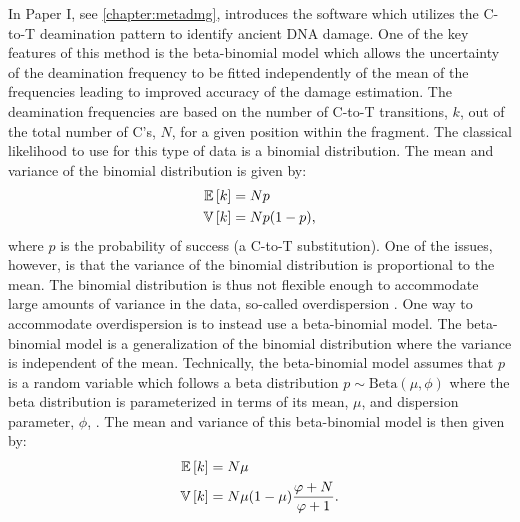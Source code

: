 In Paper I, see \autoref{chapter:metadmg}, introduces the \metaDMG software which utilizes the C-to-T deamination pattern to identify ancient DNA damage. One of the key features of this method is the beta-binomial model which allows the uncertainty of the deamination frequency to be fitted independently of the mean of the frequencies leading to improved accuracy of the damage estimation. The deamination frequencies are based on the number of C-to-T transitions, $k$, out of the total number of C's, $N$, for a given position within the fragment. The classical likelihood to use for this type of data is a binomial distribution. The mean and variance of the binomial distribution is given by:
\begin{equation}
    \begin{split}
        \mathbb{E}\left[{k}\right]  &= N p \\
        \mathbb{V}\left[{k}\right] &= Np(1-p),
        \label{eq:Binomial_expectation_variance}
    \end{split}
\end{equation}
where $p$ is the probability of success (a C-to-T substitution). One of the issues, however, is that the variance of the binomial distribution is proportional to the mean. The binomial distribution is thus not flexible enough to accommodate large amounts of variance in the data, so-called overdispersion \autocite{mcelreathStatisticalRethinkingBayesian2020}. One way to accommodate overdispersion is to instead use a beta-binomial model. The beta-binomial model is a generalization of the binomial distribution where the variance is independent of the mean. Technically, the beta-binomial model assumes that $p$ is a random variable which follows a beta distribution $p \sim \mathrm{Beta}(\mu, \phi)$ where the beta distribution is parameterized in terms of its mean, $\mu$, and dispersion parameter, $\phi$, \autocite{cepeda-cuervoDoubleGeneralizedBetaBinomial2017}. The mean and variance of this beta-binomial model is then given by:
\begin{equation}
    \begin{split}
        \mathbb{E}\left[{k}\right]  &= N \mu \\
        \mathbb{V}\left[{k}\right] &= N\mu(1-\mu) \frac{\varphi+N}{\varphi+1}.
        \label{eq:BetaBinomial_expectation_variance}
    \end{split}
\end{equation}

